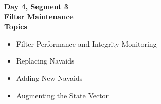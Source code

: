 \begin{frame}
\textbf{Day 4, Segment 3\\
Filter Maintenance\\
Topics}
 \begin{itemize}
 \item Filter Performance and Integrity Monitoring
 \item Replacing Navaids
 \item Adding New Navaids
 \item Augmenting the State Vector
\end{itemize}
\end{frame}





